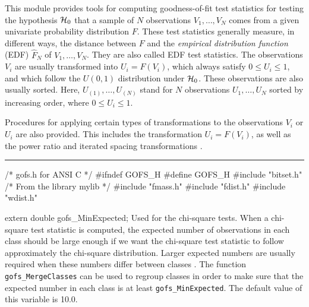 
This module provides tools for computing goodness-of-fit test statistics
for testing the hypothesis $\mathcal{H}_0$ that a sample of $N$ observations 
$V_1,\dots,V_N$ comes from a given univariate probability 
distribution $F$.
These test statistics generally measure, in different ways, the
distance between $F$ and the {\em empirical distribution function\/} 
(EDF) $\hat F_N$ of $V_1,\dots,V_N$.
They are also called EDF test statistics.
The observations $V_i$ are usually transformed into $U_i = F(V_i)$,
which always satisfy $0\le U_i\le 1$, and which
follow the $U(0,1)$ distribution under $\mathcal{H}_0$.
These observations are also usually sorted.
Here, $U_{(1)}, \dots, U_{(N)}$ stand for $N$ observations
$U_1,\dots,U_N$ sorted by increasing order, where $0\le U_i\le 1$.

Procedures for applying certain types of transformations to the
observations $V_i$ or $U_i$ are also provided.
This includes the transformation $U_i = F(V_i)$, as well as 
the power ratio and iterated spacing transformations \cite{tSTE86a}.


\bigskip\hrule\medskip
\code\hide
/* gofs.h for ANSI C */
#ifndef GOFS_H
#define GOFS_H
\endhide
#include "bitset.h"       /* From the library mylib */
#include "fmass.h"
#include "fdist.h"
#include "wdist.h"
\endcode



\code


extern double gofs_MinExpected;
\endcode
  \tab  Used for the chi-square tests.
  When a chi-square test statistic is computed, the expected number
  of observations in each class should be large enough if we want
  the chi-square test statistic to follow approximately the
  chi-square distribution.  Larger expected numbers are usually
  required when these numbers differ between classes \cite{tREA88a}.
  The function {\tt gofs\_MergeClasses} can be used to regroup classes
  in order to make sure that the expected number in each class is
  at least {\tt gofs\_MinExpected}.
  The default value of this variable is 10.0.
\iffalse %
  This is for testu01:
  For some tests, the software will merge
  classes in such a way that this is always so. For others, an error
  message will be printed if this not the case (see the {\it restrictions}
  that apply for the different tests).  
\fi %
  \endtab
\ifdetailed  %
\code


